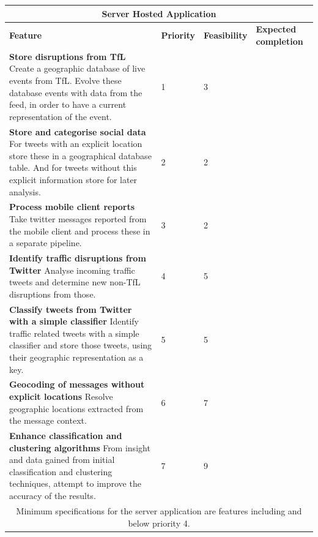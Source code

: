 \begin{center}
\begin{tabular}{ | p{8.4cm} | p{1.8cm} | p{1.8cm} | p{2.2cm} | }
\hline
\multicolumn{4}{|c|}{\textbf{Server Hosted Application}} \\ \hline
\textbf{Feature} & \textbf{Priority} & \textbf{Feasibility} & \textbf{Expected completion} \\ \hline
\textbf{Store disruptions from TfL} \newline
Create a geographic database of live events from TfL. Evolve these database events with data from the feed, in order to have a current representation of the event. & 1 & 3 & \\ \hline
\textbf{Store and categorise social data} \newline
For tweets with an explicit location store these in a geographical database
table. And for tweets without this explicit information store for later
analysis. & 2 & 2 & \\ \hline
\textbf{Process mobile client reports} \newline
Take twitter messages reported from the mobile client and process these in a
separate pipeline. & 3 & 2 & \\ \hline
\textbf{Identify traffic disruptions from Twitter} \newline
Analyse incoming traffic tweets and determine new non-TfL disruptions from
those. & 4 & 5 & \\ \hline
\textbf{Classify tweets from Twitter with a simple classifier} \newline
Identify traffic related tweets with a simple classifier and store those
tweets, using their geographic representation as a key. & 5 & 5 & \\ \hline
\textbf{Geocoding of messages without explicit locations} \newline
Resolve geographic locations extracted from the message context. & 6 & 7 & \\ \hline
\textbf{Enhance classification and clustering algorithms} \newline
From insight and data gained from initial classification and clustering
techniques, attempt to improve the accuracy of the results. & 7 & 9 & \\ \hline
\multicolumn{4}{|c|}{Minimum specifications for the server application are
features including and below priority 4.} \\ \hline
\end{tabular}
\end{center}
